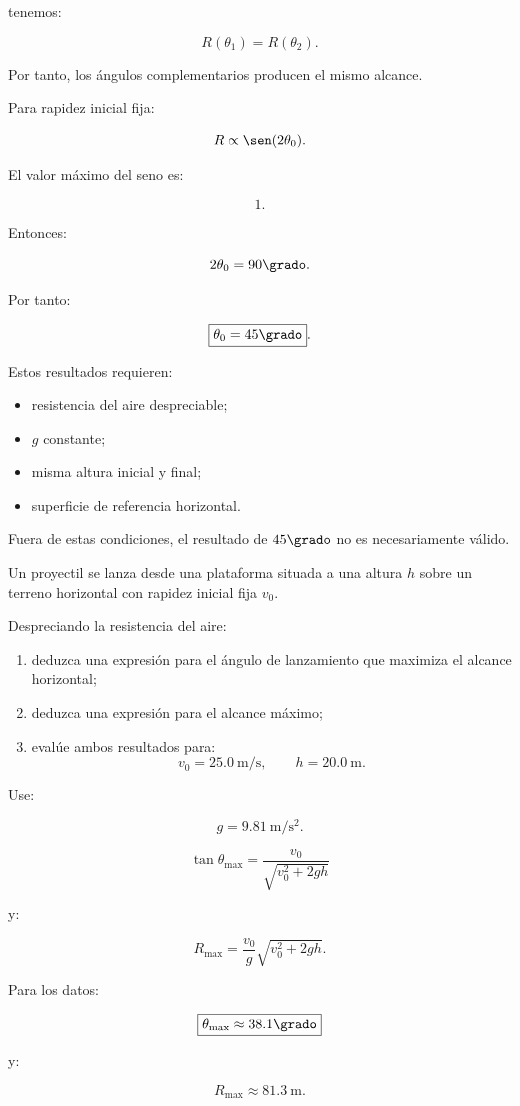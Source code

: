 \begin{explicacion}
tenemos:

\[
R(\theta_1)
=
R(\theta_2).
\]

Por tanto, los ángulos complementarios producen el mismo alcance.

Para rapidez inicial fija:

\[
R
\propto
\sen(2\theta_0).
\]

El valor máximo del seno es:

\[
1.
\]

Entonces:

\[
2\theta_0=90\grado.
\]

Por tanto:

\[
\boxed{
\theta_0=45\grado
}.
\]

Estos resultados requieren:

\begin{itemize}
    \item resistencia del aire despreciable;
    \item \(g\) constante;
    \item misma altura inicial y final;
    \item superficie de referencia horizontal.
\end{itemize}

Fuera de estas condiciones, el resultado de \(45\grado\) no es necesariamente
válido.
\end{explicacion}


\begin{ejercicio}
Un proyectil se lanza desde una plataforma situada a una altura \(h\) sobre un
terreno horizontal con rapidez inicial fija \(v_0\).

Despreciando la resistencia del aire:

\begin{enumerate}[label=\alph*)]
    \item deduzca una expresión para el ángulo de lanzamiento que maximiza el
    alcance horizontal;
    \item deduzca una expresión para el alcance máximo;
    \item evalúe ambos resultados para:
    \[
    v_0=\SI{25.0}{\meter\per\second},
    \qquad
    h=\SI{20.0}{\meter}.
    \]
\end{enumerate}

Use:

\[
g=\SI{9.81}{\meter\per\second\squared}.
\]
\end{ejercicio}

\begin{respuesta}
\[
\boxed{
\tan\theta_{\max}
=
\frac{
v_0
}{
\sqrt{v_0^2+2gh}
}
}
\]

y:

\[
\boxed{
R_{\max}
=
\frac{v_0}{g}
\sqrt{
v_0^2+2gh
}
}.
\]

Para los datos:

\[
\boxed{
\theta_{\max}\approx38.1\grado
}
\]

y:

\[
\boxed{
R_{\max}\approx\SI{81.3}{\meter}
}.
\]
\end{respuesta}

